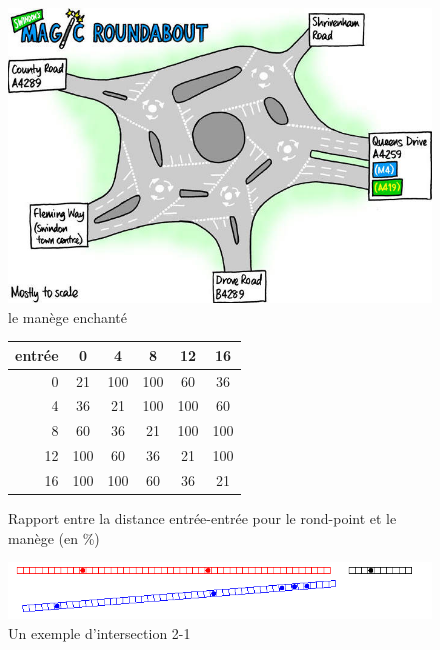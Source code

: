 \documentclass[11pt]{article}
\begin{document}
\begin{figure}[p]
	\begin{center}
		\caption{\label{rp}le manège enchanté}
		\includegraphics[scale=0.4]{images/magic-brit}
	\end{center}
\end{figure}



\begin{figure}[p]
	\begin{center}
	\begin{tabular}{ r|c c c c c}
  entrée & 0 & 4 & 8 & 12 & 16 \\ \hline
 0 & 21 & 100 & 100 & 60 & 36 \\
4 & 36 & 21 & 100 & 100 & 60 \\
8 & 60 & 36 & 21 & 100 & 100 \\
12 & 100 & 60 & 36 & 21 & 100 \\
16 & 100 & 100 & 60 & 36 & 21 \\
	\end{tabular}
	\end{center}
	\caption{\label{rpfw} Rapport entre la distance entrée-entrée pour le rond-point et le manège (en \%)}

\end{figure}


	\begin{figure}[hp]
		\begin{center}
			\includegraphics[scale=0.8]{./images/localdebut}
		\end{center}
		\caption{\label{locdeb}Un exemple d'intersection 2-1}
	\end{figure}
\end{document}
